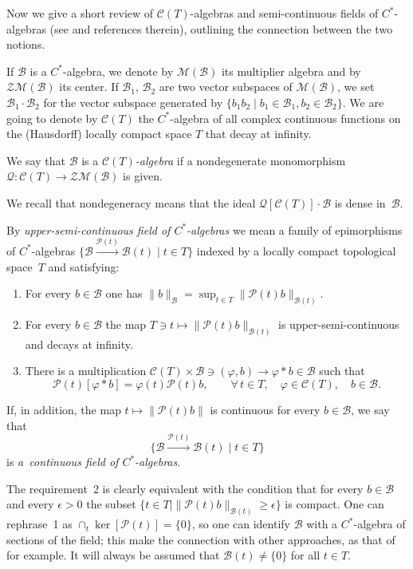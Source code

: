 \documentclass[pdftex]{sigma}
\def\C{\mathcal{C}}
\def\B{{\mathcal B}}
\def\Q{\mathcal Q}
\def\P{\mathcal P}
\begin{document}
Now we give a short review of $\C(T)$-algebras and semi-continuous f\/ields of $C^*$-algebras
(see \cite{Bl,La,Lee,Ni,Rie,Wi} and references therein), outlining the connection between the two notions.

If $\B$ is a $C^*$-algebra, we denote by $\mathcal M(\B)$ its multiplier algebra and by $\mathcal Z\mathcal M(\B)$ its center.
If $\mathcal B_1$, $\mathcal B_2$ are two vector subspaces of $\mathcal M(\B)$, we set $\B_1\cdot\B_2$ for the vector
subspace generated by $\{b_1 b_2\mid b_1\in\B_1,b_2\in\B_2\}$.
We are going to denote by $\C(T)$ the $C^*$-algebra of all complex continuous functions on the (Hausdorf\/f)
locally compact space $T$ that decay at inf\/inity.

\begin{Definition}\label{cedete}
We say that $\B$ is a {\it $\C(T)$-algebra}
if a nondegenerate monomorphism $\Q:\C(T)\rightarrow\mathcal Z\mathcal M(\B)$ is given.
\end{Definition}

We recall that nondegeneracy means that the ideal $\Q[\C(T)]\cdot\B$
is dense in~$\B$.

\begin{Definition}\label{niulaif}
By {\it upper-semi-continuous field of $C^*$-algebras} we mean a family of epimorphisms of $C^*$-algebras
$\big\{\mathcal B\overset{\P(t)}{\longrightarrow}\mathcal B(t)\mid t\in T\big\}$
indexed by a locally compact topological space~$T$ and satisfying:
\begin{enumerate}\itemsep=0pt
\item
For every $b\in\B$ one has $\| b\|_\B=\sup_{t\in T}\| \P(t)b\|_{\B(t)}$.
\item
For every $b\in\B$ the map
$T\ni t\mapsto\| \P(t)b\|_{\B(t)}$ is upper-semi-continuous and decays at inf\/inity.
\item
There is a multiplication $\C(T)\times\B\ni(\varphi,b)\rightarrow\varphi\ast b\in\B$ such that
\[
\P(t)[\varphi\ast b]=\varphi(t) \P(t)b ,\qquad \forall\,t\in T,\quad \varphi\in\C(T) ,\quad  b\in\B .
\]
\end{enumerate}
If, in addition, the map $t\mapsto\| \P(t)b\| $ is continuous for every $b\in \B$, we say that
\[
\big\{\mathcal B\overset{\P(t)}{\longrightarrow}\mathcal B(t)\mid t\in T\big\}
\] is {\it a~continuous field of
$C^*$-algebras}.
\end{Definition}

The requirement~2 is clearly equivalent with the condition that
for every $b\in\B$ and every $\epsilon>0$ the subset $\{t\in T\mid\| \P(t)b\|_{\B(t)}\ge \epsilon\}$  is compact.
One can rephrase~1 as $\cap_t\ker[\P(t)]=\{0\}$,
so one can identify $\B$ with a $C^*$-algebra of sections of the f\/ield; this make the connection with other approaches,
as that of~\cite{Ni} for example. It will always be assumed that $\B(t)\ne\{0\}$ for all $t\in T$.
\end{document}
